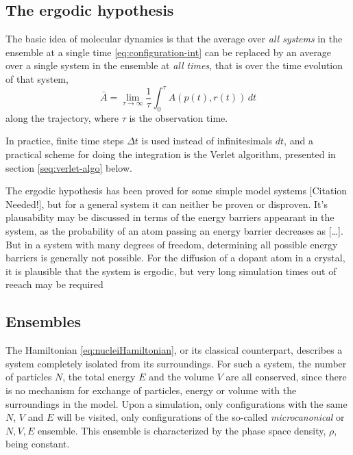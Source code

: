 \documentclass[11pt]{scrbook}   %
\begin{document}
\subsection{The ergodic hypothesis}

The basic idea of molecular dynamics is that the average over \emph{all systems} in the ensemble at a single time \eqref{eq:configuration-int} can be replaced by an average over a single system in the ensemble at \emph{all times}, that is over the time evolution of that system,
\begin{equation}
  \bar{A} = \lim_{\tau\to\infty} \frac{1}{\tau}\int_{0}^{\tau} A(p(t),r(t)) \,dt
  \label{eq:time-integral}
\end{equation}
along the trajectory, where $\tau$ is the observation time. 

In practice, finite time steps $\Delta t$ is used instead of infinitesimals $dt$, and a practical scheme for doing
the integration is the Verlet algorithm, presented in section \ref{seq:verlet-algo} below.

The ergodic hypothesis has been proved for some simple model systems [Citation Needed!], 
but for a general system it can neither be proven or disproven. 
It's plausability may be discussed in terms of the energy barriers appearant in the system,
as the probability of an atom passing an energy barrier decreases as [\ldots]. 
But in a system with many degrees of freedom, determining all possible energy barriers is generally not possible.
For the diffusion of a dopant atom in a crystal, it is plausible that the system is ergodic, but very long
simulation times out of reeach may be required


\subsection{Ensembles}

The Hamiltonian \eqref{eq:nucleiHamiltonian}, or its classical counterpart, describes a system completely isolated from its surroundings.
For such a system, the number of particles $N$, the total energy $E$ and the volume $V$ are all conserved, since there is no mechanism for exchange of particles, energy or volume with the surroundings in the model.
Upon a simulation, only configurations with the same $N$, $V$ and $E$ will be visited, only configurations of the so-called \emph{microcanonical} or $N,V,E$ ensemble. This ensemble is characterized by the phase space density, $\rho$, being constant.
\end{document}
